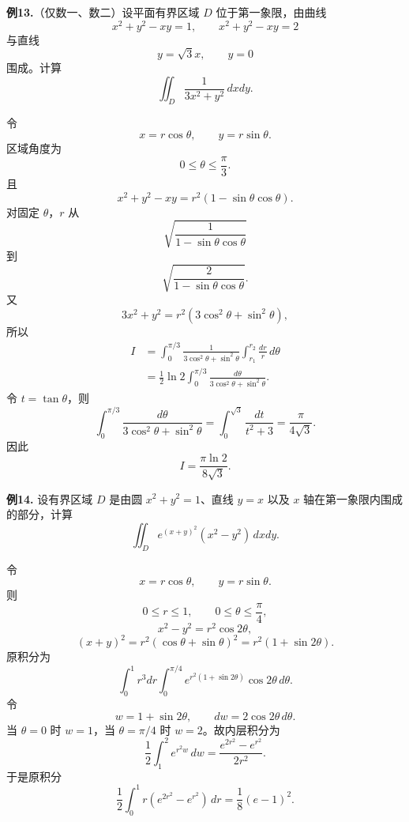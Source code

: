 \begin{problemblock}
\textbf{例13.}（仅数一、数二）设平面有界区域 \(D\) 位于第一象限，由曲线
\[
x^2+y^2-xy=1,\qquad x^2+y^2-xy=2
\]
与直线
\[
y=\sqrt3x,\qquad y=0
\]
围成。计算
\[
\iint_D\frac1{3x^2+y^2}\,dxdy.
\]
\end{problemblock}
\begin{solutionblock}
令
\[
x=r\cos\theta,\qquad y=r\sin\theta.
\]
区域角度为
\[
0\le\theta\le\frac\pi3.
\]
且
\[
x^2+y^2-xy=r^2(1-\sin\theta\cos\theta).
\]
对固定 \(\theta\)，\(r\) 从
\[
\sqrt{\frac1{1-\sin\theta\cos\theta}}
\]
到
\[
\sqrt{\frac2{1-\sin\theta\cos\theta}}.
\]
又
\[
3x^2+y^2=r^2(3\cos^2\theta+\sin^2\theta),
\]
所以
\[
\begin{aligned}
I&=\int_0^{\pi/3}
\frac{1}{3\cos^2\theta+\sin^2\theta}
\int_{r_1}^{r_2}\frac{dr}{r}\,d\theta\\
&=\frac12\ln2\int_0^{\pi/3}
\frac{d\theta}{3\cos^2\theta+\sin^2\theta}.
\end{aligned}
\]
令 \(t=\tan\theta\)，则
\[
\int_0^{\pi/3}
\frac{d\theta}{3\cos^2\theta+\sin^2\theta}
=\int_0^{\sqrt3}\frac{dt}{t^2+3}
=\frac{\pi}{4\sqrt3}.
\]
因此
\[
I=\frac{\pi\ln2}{8\sqrt3}.
\]
\end{solutionblock}

\begin{problemblock}
\textbf{例14.} 设有界区域 \(D\) 是由圆 \(x^2+y^2=1\)、直线 \(y=x\) 以及 \(x\) 轴在第一象限内围成的部分，计算
\[
\iint_D e^{(x+y)^2}(x^2-y^2)\,dxdy.
\]
\end{problemblock}
\begin{solutionblock}
令
\[
x=r\cos\theta,\qquad y=r\sin\theta.
\]
则
\[
0\le r\le1,\qquad 0\le\theta\le\frac\pi4,
\]
\[
x^2-y^2=r^2\cos2\theta,
\]
\[
(x+y)^2=r^2(\cos\theta+\sin\theta)^2=r^2(1+\sin2\theta).
\]
原积分为
\[
\int_0^1r^3dr\int_0^{\pi/4}
e^{r^2(1+\sin2\theta)}\cos2\theta\,d\theta.
\]
令
\[
w=1+\sin2\theta,\qquad dw=2\cos2\theta\,d\theta.
\]
当 \(\theta=0\) 时 \(w=1\)，当 \(\theta=\pi/4\) 时 \(w=2\)。故内层积分为
\[
\frac12\int_1^2e^{r^2w}\,dw
=\frac{e^{2r^2}-e^{r^2}}{2r^2}.
\]
于是原积分
\[
\frac12\int_0^1r(e^{2r^2}-e^{r^2})\,dr
=\frac18(e-1)^2.
\]
\end{solutionblock}

